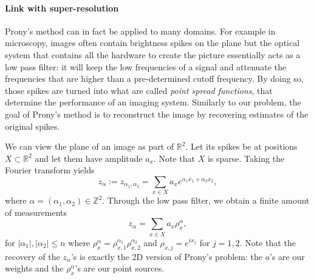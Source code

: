 \paragraph{Link with super-resolution} Prony's method can in fact be applied to many domains. For example in microscopy, images often contain brightness spikes on the plane but the optical system that contains all the hardware to create the picture essentially acts as a low pass filter: it will keep the low frequencies of a signal and attenuate the frequencies that are higher than a pre-determined cutoff frequency. By doing so, those spikes are turned into what are called \textit{point spread functions}, that determine the performance of an imaging system. Similarly to our problem, the goal of Prony's method is to reconstruct the image by recovering estimates of the original spikes.\par 
We can view the plane of an image as part of $\mathbb{R}^2$. Let its spikes be at positions $X\subset\mathbb{R}^2$ and let them have amplitude $a_x$. Note that $X$ is sparse. Taking the Fourier transform yields $$z_\alpha:=z_{\alpha_1,\alpha_2}=\sum_{x\in X}a_xe^{\alpha_1 x_1+\alpha_2 x_2},$$ where $\alpha=(\alpha_1,\alpha_2)\in\mathbb{Z}^2$. Through the low pass filter, we obtain a finite amount of measurements $$z_\alpha=\sum_{x\in X}a_x\rho_x^\alpha,$$ for $|\alpha_1|,|\alpha_2|\leq n$ where $\rho_x^\alpha=\rho_{x,1}^{\alpha_1}\rho_{x,2}^{\alpha_2}$ and $\rho_{x,j}=e^{ix_j}$ for $j=1,2$. Note that the recovery of the $z_\alpha$'s is exactly the 2D version of Prony's problem: the $a$'s are our weights and the $\rho_x^\alpha$'s are our point sources.
